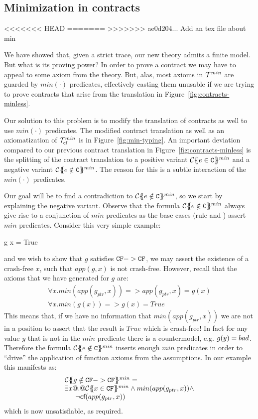 \subsection{Minimization in contracts}
<<<<<<< HEAD
\newcommand{\ctransmin}[3]{\ctrans{#1}{#2}{#3}^{min}}
\newcommand{\calI}{{\cal J}}
=======
>>>>>>> ae0d204... Add an tex file about min

We have showed that, given a strict trace, our new theory admits a finite model. But what is its proving
power? In order to prove a contract we may have to appeal to some axiom from the theory. But, alas, most
axioms in ${\cal T}^{min}$ are guarded by $min(\cdot)$ predicates, effectively casting them unusable if we are
trying to prove contracts that arise from the translation in Figure~\ref{fig:contracts-minless}.

Our solution to this problem is to modify the translation of contracts as well to use $min(\cdot)$ predicates.
The modified contract translation as well as an axiomatization of ${\cal T}_{\textsf{cf}}^{min}$ is in Figure~\ref{fig:min-typing}.
An important deviation compared to our previous contract translation in Figure~\ref{fig:contracts-minless} is the
splitting of the contract translation to a positive variant $\ctransmin{}{\Gamma}{e \in \Ct}$ and a negative
variant $\ctransmin{}{\Gamma}{e \notin \Ct}$. The reason for this is a subtle interaction of the $min(\cdot)$
predicates.

Our goal will be to find a contradiction to $\ctransmin{}{\Gamma}{e \notin \Ct}$, so we start by explaining
the negative variant. Observe that the formula $\ctransmin{}{\Gamma}{e \notin \Ct}$
always give rise to a conjunction of $min$ predicates as the base cases (rule  and )
assert $min$ predicates. Consider this very simple example:
\begin{code}
g x  = True
\end{code}
and we wish to show that $g$ satisfies ${\tt CF} -> {\tt CF}$, we may assert the existence of a crash-free $x$, such that
$app(g,x)$ is not crash-free. However, recall that the axioms that we have generated for $g$ are:
\[\begin{array}{l}
   \forall x. min(app(g_{ptr},x)) => app(g_{ptr},x) = g(x) \\
   \forall x. min(g(x)) => g(x) = True
\end{array}\]
This means that, if we have no information that $min(app(g_{ptr},x))$ we are not in a position
to assert that the result is $True$ which is crash-free! In fact for any value $y$ that is not
in the $min$ predicate there is a countermodel, e.g. $g(y) = \mathop{bad}$. Therefore the formula
$\ctransmin{}{\Gamma}{e \notin \Ct}$ inserts enough $min$ predicates in order to ``drive''
the application of function axioms from the assumptions. In our example this manifests as:
\[\begin{array}{l}
   \ctransmin{}{}{g \notin \CF -> \CF} = \\
  \exists x @.@ \ctransmin{}{}{x \in \CF} \land min(app(g_{ptr},x)) \land \\
  \quad\;\; \neg\lcf{app(g_{ptr},x)}
\end{array}\]
which is now unsatisfiable, as required.

